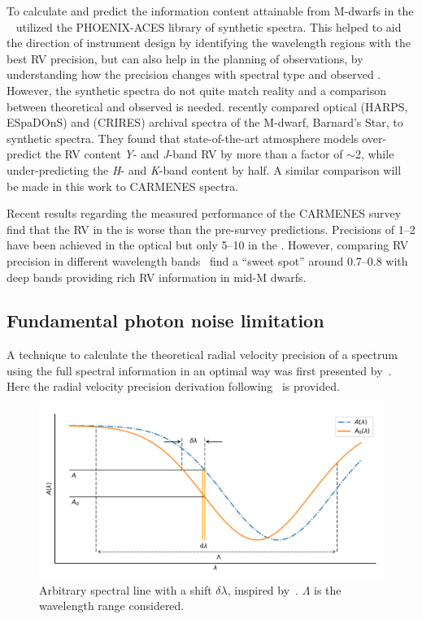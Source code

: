To calculate and predict the information content attainable from {M-dwarfs} in the \nir{}~\cite{figueira_radial_2016} utilized the {PHOENIX-ACES} library of synthetic spectra.
This helped to aid the direction of instrument design by identifying the wavelength regions with the best {RV} precision, but can also help in the planning of observations, by understanding how the precision changes with spectral type and observed {\snr{}}.
However, the synthetic spectra do not quite match reality and a comparison between theoretical and observed is needed.
\citet{artigau_optical_2018} recently compared optical (HARPS, ESpaDOnS) and \nir{} (CRIRES) archival spectra of the M-dwarf, Barnard's Star, to synthetic spectra. They found that state-of-the-art atmosphere models over-predict the {RV} content \emph{Y}- and \emph{J}-band {RV} by more than a factor of \(\sim\)2, while under-predicting the \emph{H}- and \emph{K}-band content by half. A similar comparison will be made in this work to {CARMENES} spectra.

Recent results regarding the measured performance of the CARMENES survey~\citep{reiners_carmenes_2018,quirrenbach_carmenes_2018} find that the {RV} in the \nir{} is worse than the pre-survey predictions. Precisions of 1--2\mps{} have been achieved in the optical but only 5--10\mps{} in the \nir{}. However, comparing RV precision in different wavelength bands~\citet{quirrenbach_carmenes_2018} find a ``sweet spot'' around 0.7--0.8\um{} with deep  bands providing rich {RV} information in mid-M dwarfs.


\subsection{Fundamental photon noise limitation}
\label{subsec:fundamental_precision}
A technique to calculate the theoretical radial velocity precision of a spectrum using the full spectral information in an optimal way was first presented by~\citet{connes_absolute_1985}.
Here the radial velocity precision derivation following~\citet{connes_absolute_1985, bouchy_fundamental_2001, figueira_radial_2016} is provided.

\begin{figure}
    \centering
    \includegraphics[width=0.7\linewidth]{figures/information-content/precision_plot.pdf}
    \caption[Demonstration of a shifted arbitrary spectral line.]{Arbitrary spectral line with a shift \(\delta \lambda\), inspired by~\citet{connes_absolute_1985}.
    \(\Lambda\) is the wavelength range considered.}
    \label{fig:precisionderivation}
\end{figure}

